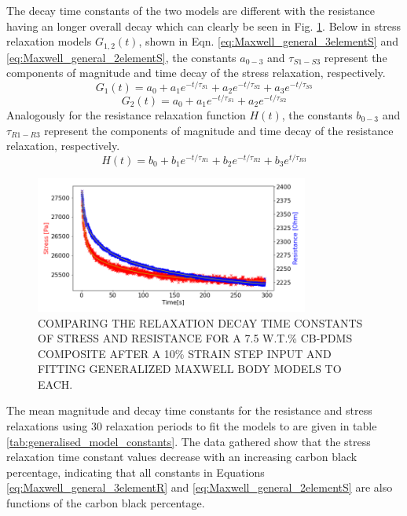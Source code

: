 The decay time constants of the two models are different with the resistance having an longer overall decay which can clearly be seen in Fig. \ref{fig:diff_tau_res_stress}. Below in stress relaxation models $G_{1,2}(t)$, shown in Eqn. \ref{eq:Maxwell_general_3elementS} and \ref{eq:Maxwell_general_2elementS}, the constants $a_{0-3}$ and $\tau_{S1-S3}$ represent the components of magnitude and time decay of the stress relaxation, respectively.
\begin{equation}
	G_1(t) = a_0 + a_1e^{-t/\tau_{S1}} + a_2e^{-t/\tau_{S2}} + a_3e^{-t/\tau_{S3}}
	\label{eq:Maxwell_general_3elementS} 
\end{equation}
\begin{equation}
	G_2(t) = a_0 + a_1e^{-t/\tau_{S1}} + a_2e^{-t/\tau_{S2}}
	\label{eq:Maxwell_general_2elementS} 
\end{equation}
Analogously for the resistance relaxation function $H(t)$, the constants $b_{0-3}$ and $\tau_{R1-R3}$ represent the components of magnitude and time decay of the resistance relaxation, respectively. 
\begin{equation}
	H(t) = b_0 + b_1e^{-t/\tau_{R1}} + b_2e^{-t/\tau_{R2}} + b_3e^{t/\tau_{R3}}
	\label{eq:Maxwell_general_3elementR} 
\end{equation}
\begin{figure}[H]
	\centering
	\includegraphics[width=9cm]{Figures/diff_time_const_Res_Stress_2_7-5_Epin_20mm_v3_pulse_6.png}
	\caption{COMPARING THE RELAXATION DECAY TIME CONSTANTS OF STRESS AND RESISTANCE FOR A 7.5 W.T.\% CB-PDMS COMPOSITE AFTER A 10\% STRAIN STEP INPUT AND FITTING GENERALIZED MAXWELL BODY MODELS TO EACH.}
	\label{fig:diff_tau_res_stress}
\end{figure}
The mean magnitude and decay time constants for the resistance and stress relaxations using 30 relaxation periods to fit the models to are given in table \ref{tab:generalised_model_constants}. The data gathered show that the stress relaxation time constant values decrease with an increasing carbon black percentage, indicating that all constants in Equations \ref{eq:Maxwell_general_3elementR} and \ref{eq:Maxwell_general_2elementS} are also functions of the carbon black percentage.

